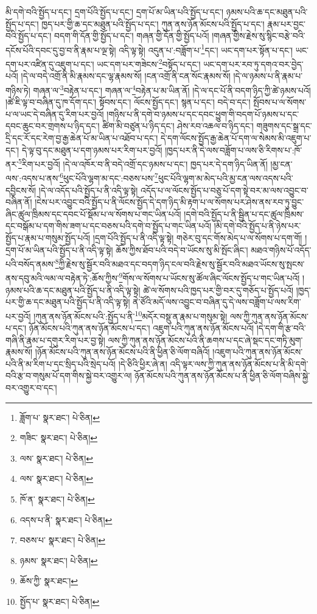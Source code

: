 མི་དགེ་བའི་སྤྱོད་པ་དང་། དྲག་པོའི་སྤྱོད་པ་དང་། དྲག་པོ་མ་ཡིན་པའི་སྤྱོད་པ་དང་། ཉམས་པའི་ཆ་དང་མཐུན་པའི་སྤྱོད་པ་དང་། ཁྱད་པར་གྱི་ཆ་དང་མཐུན་པའི་སྤྱོད་པ་དང་། ཀུན་ནས་ཉོན་མོངས་པའི་སྤྱོད་པ་དང་། རྣམ་པར་བྱང་བའི་སྤྱོད་པ་དང་། བདག་གི་དོན་གྱི་སྤྱོད་པ་དང་། གཞན་གྱི་དོན་གྱི་སྤྱོད་པའོ། །གཞན་གྱིས་རྗེས་སུ་སྙིང་བརྩེ་བའི་དངོས་པོའི་དབང་དུ་བྱ་བ་ནི་རྣམ་པ་ལྔ་སྟེ། འདི་ལྟ་སྟེ། འདུན་པ་:བཟློག་པ་\footnote{ཟློག་པ་  སྣར་ཐང་།  པེ་ཅིན། }དང་། ཡང་དག་པར་སྟོན་པ་དང་། ཡང་དག་པར་འཛིན་དུ་འཇུག་པ་དང་། ཡང་དག་པར་གཟེངས་\footnote{གཟིང་  སྣར་ཐང་།  པེ་ཅིན། }བསྟོད་པ་དང་། ཡང་དག་པར་རབ་ཏུ་དགའ་བར་བྱེད་པའོ། །དེ་ལ་བདེ་འགྲོ་ནི་མི་རྣམས་དང་ལྷ་རྣམས་སོ། །ངན་འགྲོ་ནི་ངན་སོང་རྣམས་སོ། །དེ་ལ་ཉམས་པ་ནི་རྣམ་པ་གཉིས་ཏེ། གཞན་ལ་\footnote{ལས་  སྣར་ཐང་།  པེ་ཅིན། }བརྟེན་པ་དང་། གཞན་ལ་\footnote{ལས་  སྣར་ཐང་།  པེ་ཅིན། }བརྟེན་པ་མ་ཡིན་ནོ། །དེ་ལ་དང་པོ་ནི་བདག་ཉིད་ཀྱི་ཚེ་ཉམས་པའོ། །ཚེ་ཇི་ལྟ་བ་བཞིན་དུ་ཁ་དོག་དང་། སྟོབས་དང་། ལོངས་སྤྱོད་དང་། སྙན་པ་དང་། བདེ་བ་དང་། སྤོབས་པ་ལ་སོགས་པ་ལ་ཡང་དེ་བཞིན་དུ་རིག་པར་བྱའོ། །གཉིས་པ་ནི་དགེ་བ་ཉམས་པ་དང་དབང་ཕྱུག་གི་བདག་པོ་ཉམས་པ་དང་དབང་ཆུང་བར་གྲགས་པ་ཉིད་དང་། ཚིག་མི་བཙུན་པ་ཉིད་དང་། ཤེས་རབ་འཆལ་བ་ཉིད་དང་། གཟུགས་དང་སྒྲ་དང་དྲི་དང་རོ་དང་རེག་བྱ་རྒྱ་ཆེན་པོ་མ་ཡིན་པ་འཐོབ་པ་དང་། དེ་དག་ལོངས་སྤྱོད་རྒྱ་ཆེན་པོ་དག་ལ་སེམས་མི་འཇུག་པ་དང་། དེ་ལྟ་བུ་དང་མཐུན་པ་དག་ཉམས་པར་རིག་པར་བྱའོ། །ཁྱད་པར་ནི་དེ་ལས་བཟློག་པ་ལས་ཅི་རིགས་པ་:ཁོ་ནར་\footnote{ཁོ་ན་  སྣར་ཐང་།  པེ་ཅིན། }རིག་པར་བྱའོ། །དེ་ལ་འཁོར་བ་ནི་བདེ་འགྲོ་དང་ཉམས་པ་དང་། ཁྱད་པར་དེ་དག་ཉིད་ཡིན་ནོ། །མྱ་ངན་ལས་:འདས་པ་ནས་\footnote{འདས་པ་ནི་  སྣར་ཐང་།  པེ་ཅིན། }ཕུང་པོའི་ལྷག་མ་དང་:བཅས་པས་\footnote{བཅས་པ་  སྣར་ཐང་།  པེ་ཅིན། }ཕུང་པོའི་ལྷག་མ་མེད་པའི་མྱ་ངན་ལས་འདས་པའི་དབྱིངས་སོ། །དེ་ལ་འདོད་པའི་སྤྱོད་པ་ནི་འདི་ལྟ་སྟེ། འདོད་པ་ལ་ལོངས་སྤྱོད་པ་བཅུ་པོ་དག་སྟེ་བར་མ་ལས་འབྱུང་བ་བཞིན་ནོ། །ངེས་པར་འབྱུང་བའི་སྤྱོད་པ་ནི་ལོངས་སྤྱོད་དེ་དག་ཉིད་མི་རྟག་པ་ལ་སོགས་པར་ཤེས་ནས་རབ་ཏུ་བྱུང་ཞིང་ཚུལ་ཁྲིམས་དང་དབང་པོ་སྡོམ་པ་ལ་སོགས་པ་གང་ཡིན་པའོ། །དགེ་བའི་སྤྱོད་པ་ནི་སྦྱིན་པ་དང་ཚུལ་ཁྲིམས་དང་བསྒོམ་པ་དག་གིས་ཟག་པ་དང་བཅས་པའི་དགེ་བ་སྤྱོད་པ་གང་ཡིན་པའོ། །མི་དགེ་བའི་སྤྱོད་པ་ནི་ཉེས་པར་སྤྱོད་པ་རྣམ་པ་གསུམ་སྤྱོད་པའོ། །དྲག་པོའི་སྤྱོད་པ་ནི་འདི་ལྟ་སྟེ། གཅེར་བུ་དང་གོས་མེད་པ་ལ་སོགས་པ་དག་གོ། །དྲག་པོ་མ་ཡིན་པའི་སྤྱོད་པ་ནི་འདི་ལྟ་སྟེ། ཆོས་ཀྱིས་ཐོབ་པའི་བདེ་བ་ཡོངས་སུ་མི་སྤོང་ཞིང་། མཐའ་གཉིས་པོ་འདོད་པའི་བསོད་ནམས་\footnote{ཉམས་  སྣར་ཐང་།  པེ་ཅིན། }ཀྱི་རྗེས་སུ་སྦྱོར་བའི་མཐའ་དང་བདག་ཉིད་ངལ་བའི་རྗེས་སུ་སྦྱོར་བའི་མཐའ་ཡོངས་སུ་སྤངས་ནས་དབུ་མའི་ལམ་ལ་བརྟེན་ཏེ་:ཆོས་ཀྱིས་\footnote{ཆོས་ཀྱི་  སྣར་ཐང་། }གོས་ལ་སོགས་པ་ཡོངས་སུ་ཚོལ་ཞིང་ལོངས་སྤྱོད་པ་གང་ཡིན་པའོ། །ཉམས་པའི་ཆ་དང་མཐུན་པའི་སྤྱོད་པ་ནི་འདི་ལྟ་སྟེ། ཚེ་ལ་སོགས་པའི་ཁྱད་པར་གྱི་བར་དུ་གཅོད་པ་སྤྱོད་པའོ། །ཁྱད་པར་གྱི་ཆ་དང་མཐུན་པའི་སྤྱོད་པ་ནི་འདི་ལྟ་སྟེ། ནེ་ཙོའི་མདོ་ལས་འབྱུང་བ་བཞིན་དུ་དེ་ལས་བཟློག་པ་ལས་རིག་པར་བྱའོ། །ཀུན་ནས་ཉོན་མོངས་པའི་:སྤྱོད་པ་ནི་\footnote{སྤྱོད་པ་  སྣར་ཐང་།  པེ་ཅིན། }མདོར་བསྡུ་ན་རྣམ་པ་གསུམ་སྟེ། ལས་ཀྱི་ཀུན་ནས་ཉོན་མོངས་པ་དང་། ཉོན་མོངས་པའི་ཀུན་ནས་ཉོན་མོངས་པ་དང་། འཇུག་པའི་ཀུན་ནས་ཉོན་མོངས་པའོ། །དེ་དག་གི་རྩ་བའི་གཞི་ནི་རྣམ་པ་དགུར་རིག་པར་བྱ་སྟེ། ལས་ཀྱི་ཀུན་ནས་ཉོན་མོངས་པའི་ནི་ཆགས་པ་དང་ཞེ་སྡང་དང་གཏི་མུག་རྣམས་སོ། །ཉོན་མོངས་པའི་ཀུན་ནས་ཉོན་མོངས་པའི་ནི་ཕྱིན་ཅི་ལོག་བཞིའོ། །འཇུག་པའི་ཀུན་ནས་ཉོན་མོངས་པའི་ནི་མ་རིག་པ་དང་སྲིད་པའི་སྲེད་པའོ། །དེ་ཅིའི་ཕྱིར་ཞེ་ན། འདི་ལྟར་ལས་ཀྱི་ཀུན་ནས་ཉོན་མོངས་པ་ནི་མི་དགེ་བའི་རྩ་བ་གསུམ་པོ་དག་གིས་སྐྱེ་བར་འགྱུར་ལ། ཉོན་མོངས་པའི་ཀུན་ནས་ཉོན་མོངས་པ་ནི་ཕྱིན་ཅི་ལོག་བཞིས་སྐྱེ་བར་འགྱུར་བ་དང་། 